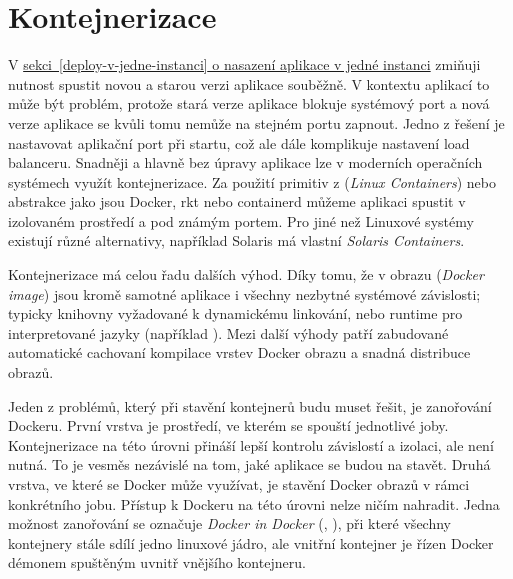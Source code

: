     \section*{Kontejnerizace}
        V \hyperref[deploy-v-jedne-instanci]{sekci~\ref*{deploy-v-jedne-instanci} o nasazení aplikace v jedné instanci} zmiňuji nutnost spustit novou a starou verzi aplikace souběžně. V kontextu \HTTP aplikací to může být problém, protože stará verze aplikace blokuje systémový port a nová verze aplikace se kvůli tomu nemůže na stejném portu zapnout. Jedno z řešení je nastavovat aplikační port při startu, což ale dále komplikuje nastavení load balanceru. Snadněji a hlavně bez úpravy aplikace lze v moderních operačních systémech využít kontejnerizace. Za použití primitiv z  (\textit{Linux Containers}) nebo abstrakce jako jsou Docker, rkt nebo containerd můžeme aplikaci spustit v izolovaném prostředí a pod známým portem. Pro jiné než Linuxové systémy existují různé alternativy, například Solaris má vlastní \textit{Solaris Containers}.

        Kontejnerizace má celou řadu dalších výhod. Díky tomu, že v obrazu (\textit{Docker image}) jsou kromě samotné aplikace i všechny nezbytné systémové závislosti; typicky knihovny vyžadované k dynamickému linkování, nebo runtime pro interpretované jazyky (například ). Mezi další výhody patří zabudované automatické cachovaní kompilace vrstev Docker obrazu a snadná distribuce obrazů.

        \label{sec:dind}
        Jeden z problémů, který při stavění kontejnerů budu muset řešit, je zanořování Dockeru. První vrstva je prostředí, ve kterém se spouští jednotlivé \CI joby. Kontejnerizace na této úrovni přináší lepší kontrolu závislostí a izolaci, ale není nutná. To je vesměs nezávislé na tom, jaké aplikace se budou na \CI stavět. Druhá vrstva, ve které se Docker může využívat, je stavění Docker obrazů v rámci konkrétního \CI jobu. Přístup k Dockeru na této úrovni nelze ničím nahradit. Jedna možnost zanořování se označuje \textit{Docker in Docker} (, ), při které všechny kontejnery stále sdílí jedno linuxové jádro, ale vnitřní kontejner je řízen Docker démonem spuštěným uvnitř vnějšího kontejneru.

